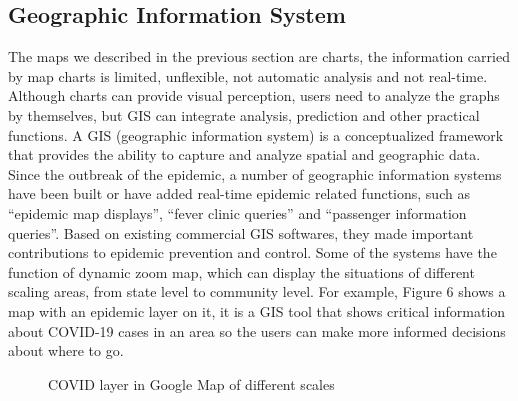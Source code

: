 \documentclass[sigplan,screen]{acmart}
\begin{document}
\subsection{Geographic Information System}
The maps we described in the previous section are charts, the information carried by map charts is limited, unflexible, not automatic analysis and not real-time.
Although charts can provide visual perception, users need to analyze the graphs by themselves, but GIS can integrate analysis, prediction and other practical functions.
A GIS (geographic information system) is a conceptualized framework that provides the ability to capture and analyze spatial and geographic data\cite{clarke1986advances}.
Since the outbreak of the epidemic, a number of geographic information systems have been built or have added real-time epidemic related functions, such as ``epidemic map displays'', ``fever clinic queries'' and ``passenger information queries''.
Based on existing commercial GIS softwares, they made important contributions to epidemic prevention and control\cite{zhou2020covid}.
Some of the systems have the function of dynamic zoom map, which can display the situations of different scaling areas, from state level to community level.
For example, Figure 6 shows a map with an epidemic layer on it, it is a GIS tool that shows critical information about COVID-19 cases in an area so the users can make more informed decisions about where to go.
\begin{figure}[htb]
	\centering
	\caption{COVID layer in Google Map of different scales}
\end{figure}
\end{document}
